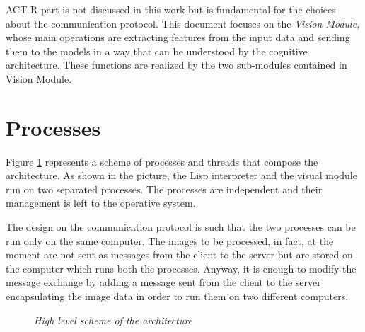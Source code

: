 	\mbox{ACT-R} part is not discussed in this work but is fundamental for the choices about the communication protocol.
	This document focuses on the \emph{Vision Module}, whose main operations are extracting features from the input data and sending them to the models in a way that can be understood by the cognitive architecture. 
	These functions are realized by the two sub-modules contained in Vision Module.

	\section{Processes}
	Figure \ref{fig:processes} represents a scheme of processes and threads that compose the architecture.
	As shown in the picture, the \mbox{Lisp} interpreter and the visual module run on two separated processes. 
	The processes are independent and their management is left to the operative system.

	The design on the communication protocol is such that the two processes can be run only on the same computer. 
	The images to be processed, in fact, at the moment are not sent as messages from the client to the server but are stored on the computer which runs both the processes.
	Anyway, it is enough to modify the message exchange by adding a message sent from the client to the server encapsulating the image data in order to run them on two different computers.
	
	\begin{figure}[h]
	  \begin{center} 
	  \end{center} 
	  \caption{\textit{High level scheme of the architecture}}  
	  \label{fig:processes}
 	\end{figure}

